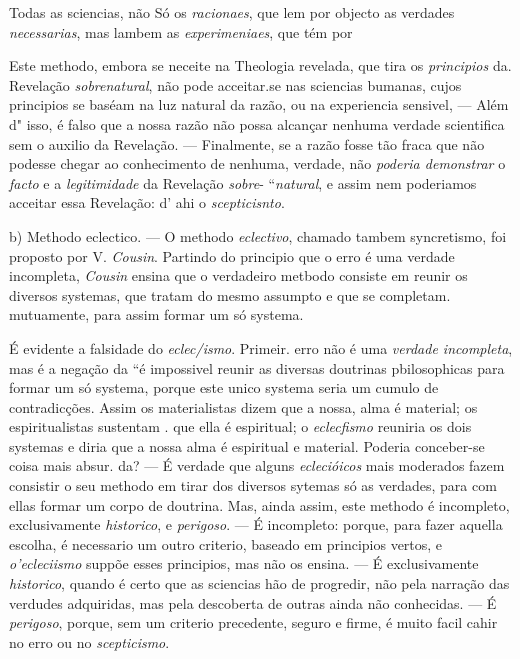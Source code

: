 
  
Todas as sciencias, não Só os \emph{racionaes}, que lem por objecto as verdades \emph{necessarias}, mas lambem as \emph{experimeniaes}, que tém por

Este methodo, embora se neceite na Theologia revelada, que tira os \emph{principios} da. Revelação \emph{sobrenatural}, não pode acceitar.se nas sciencias bumanas, cujos principios se baséam na luz natural da razão, ou na experiencia sensivel, --- Além d" isso, é falso que a nossa razão não possa alcançar nenhuma verdade scientifica sem o auxilio da Revelação. --- Finalmente, se a razão fosse tão fraca que não podesse chegar ao conhecimento de nenhuma, verdade, não \emph{poderia demonstrar} o \emph{facto} e a \emph{legitimidade} da Revelação \emph{sobre}- “\emph{natural}, e assim nem poderiamos acceitar essa Revelação: d' ahi o \emph{scepticisnto}.

b) Methodo eclectico. --- O methodo \emph{eclectivo}, chamado tambem syncretismo, foi proposto por V. \emph{Cousin}. Partindo do principio que o erro é uma verdade incompleta, \emph{Cousin} ensina que o verdadeiro metbodo consiste em reunir os diversos systemas, que tratam do mesmo assumpto e que se completam. mutuamente, para assim formar um só systema.

É evidente a falsidade do \emph{eclec/ismo}. Primeir. erro não é uma \emph{verdade incompleta}, mas é a negação da “é impossivel reunir as diversas doutrinas pbilosophicas para formar um só systema, porque este unico systema seria um cumulo de contradicções. Assim os materialistas dizem que a nossa, alma é material; os espiritualistas sustentam . que ella é espiritual; o \emph{eclecfismo} reuniria os dois systemas e diria que a nossa alma é espiritual e material. Poderia conceber-se coisa mais absur. da? --- É verdade que alguns \emph{eclecióicos} mais moderados fazem consistir o seu methodo em tirar dos diversos sytemas só as verdades, para com ellas formar um corpo de doutrina. Mas, ainda assim, este methodo é incompleto, exclusivamente \emph{historico}, e \emph{perigoso}. --- É incompleto: porque, para fazer aquella escolha, é necessario um outro criterio, baseado em principios vertos, e \emph{o'ecleciismo} suppõe esses principios, mas não os ensina. --- É exclusivamente \emph{historico}, quando é certo que as sciencias hão de progredir, não pela narração das verdudes adquiridas, mas pela descoberta de outras ainda não conhecidas. --- É \emph{perigoso}, porque, sem um criterio precedente, seguro e firme, é muito facil cahir no erro ou no \emph{scepticismo}.

